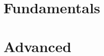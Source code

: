 \documentclass[12pt]{article}
\title{}
\author{Amaan Rahman}
\begin{document}
\maketitle
\section*{Fundamentals}

\section*{Advanced}

\end{document}
